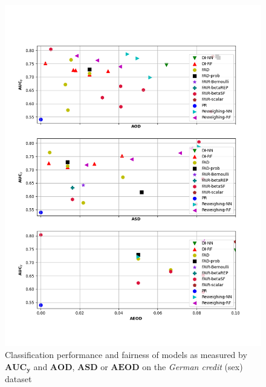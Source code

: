 \documentclass[preprint,12pt]{elsarticle}
\begin{document}
\begin{figure}
	\center
	\includegraphics[angle=0, width=1\textwidth]{Ger_sex_all.png}
	\captionsetup{justification=centering}
	\caption{Classification performance and fairness of models as measured by $\mathbf{AUC_y}$ and $\mathbf{AOD}$, $\mathbf{ASD}$ or $\mathbf{AEOD}$ on the \textit{German credit} (sex) dataset}
	\label{fig:Ger_sex all}
	\vskip -0.2in
\end{figure}
\end{document}
